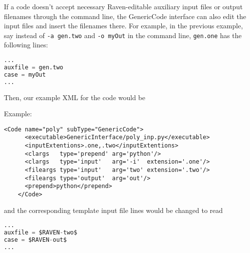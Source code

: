 If a code doesn't accept necessary Raven-editable auxiliary input files 
or output filenames through the command line, the GenericCode interface
can also edit the input files and insert the filenames there.  For example,
in the previous example, say instead of \texttt{-a gen.two} and \texttt{-o myOut}
in the command line, \texttt{gen.one} has the following lines:
\begin{lstlisting}[language=python]
...
auxfile = gen.two
case = myOut
...
\end{lstlisting}
Then, our example XML for the code would be

Example:
\begin{lstlisting}[style=XML]
    <Code name="poly" subType="GenericCode">
      <executable>GenericInterface/poly_inp.py</executable>
      <inputExtentions>.one,.two</inputExtentions>
      <clargs   type='prepend' arg='python'/>
      <clargs   type='input'   arg='-i'  extension='.one'/>
      <fileargs type='input'   arg='two' extension='.two'/>
      <fileargs type='output'  arg='out'/>
      <prepend>python</prepend>
    </Code>
\end{lstlisting}
and the corresponding template input file lines would be changed to read
\begin{lstlisting}[language=python]
...
auxfile = $RAVEN-two$
case = $RAVEN-out$
...
\end{lstlisting}

